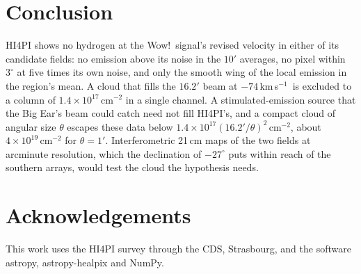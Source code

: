 \documentclass[3p,11pt]{elsarticle}
\newcommand{\kms}{km\,s$^{-1}$}
\begin{document}
\section{Conclusion}\label{sec:conclusion}

HI4PI shows no hydrogen at the Wow!\ signal's revised velocity in either of its candidate
fields: no emission above its noise in the $10'$ averages, no pixel within $3^\circ$ at
five times its own noise, and only the smooth wing of the local emission in the region's
mean. A cloud that fills the $16.2'$ beam at $-74$\,\kms\ is excluded to a column of
$1.4\times10^{17}$\,cm$^{-2}$ in a single channel. A stimulated-emission source that the
Big Ear's beam could catch need not fill HI4PI's, and a compact cloud of angular size
$\theta$ escapes these data below $1.4\times10^{17}(16.2'/\theta)^2$\,cm$^{-2}$, about
$4\times10^{19}$\,cm$^{-2}$ for $\theta=1'$. Interferometric 21\,cm maps of the two
fields at arcminute resolution, which the declination of $-27^\circ$ puts within reach of
the southern arrays, would test the cloud the hypothesis needs.

\section*{Acknowledgements}

This work uses the HI4PI survey through the CDS, Strasbourg, and the software astropy,
astropy-healpix and NumPy.
\end{document}
